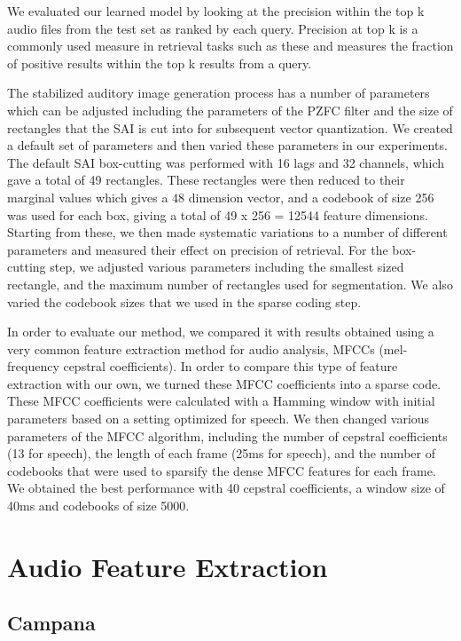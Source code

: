 We evaluated our learned model by looking at the precision within the
top k audio files from the test set as ranked by each query.
Precision at top k is a commonly used measure in retrieval tasks such as these
and measures the fraction of positive results within the top k results from a
query.

The stabilized auditory image generation process has a number of
parameters which can be adjusted including the parameters of the PZFC
filter and the size of rectangles that the SAI is cut into for
subsequent vector quantization.  We created a default set of
parameters and then varied these parameters in our experiments.  The
default SAI box-cutting was performed with 16 lags and 32 channels,
which gave a total of 49 rectangles.  These rectangles were then
reduced to their marginal values which gives a 48 dimension vector,
and a codebook of size 256 was used for each box, giving a total of 49
x 256 = 12544 feature dimensions.  Starting from these, we then made
systematic variations to a number of different parameters and measured
their effect on precision of retrieval.  For
the box-cutting step, we adjusted various parameters including the
smallest sized rectangle, and the maximum number of rectangles used
for segmentation.  We also varied the codebook sizes that we used in
the sparse coding step.

In order to evaluate our method, we compared it with results obtained
using a very common feature extraction method for audio analysis, MFCCs
(mel-frequency cepstral coefficients).  In order to compare this type
of feature extraction with our own, we turned these MFCC coefficients
into a sparse code.  These MFCC coefficients were calculated with a
Hamming window with initial parameters based on a setting optimized
for speech.  We then changed various parameters of the MFCC algorithm,
including the number of cepstral coefficients (13 for speech), the
length of each frame (25ms for speech), and the number of codebooks
that were used to sparsify the dense MFCC features for each frame.  We
obtained the best performance with 40 cepstral coefficients, a window
size of 40ms and codebooks of size 5000.




\section{Audio Feature Extraction}

\subsection{Campana}


